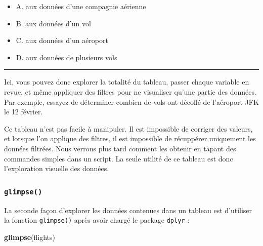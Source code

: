 \documentclass[a4paperpaper,]{article}
\newenvironment{Shaded}{\begin{snugshade}}{\end{snugshade}}
\newcommand{\KeywordTok}[1]{\textcolor[rgb]{0.12,0.11,0.11}{\textbf{#1}}}
\newcommand{\NormalTok}[1]{\textcolor[rgb]{0.12,0.11,0.11}{#1}}
\providecommand{\tightlist}{%
  \setlength{\itemsep}{0pt}\setlength{\parskip}{0pt}}
\theoremstyle{definition}
\theoremstyle{definition}
\theoremstyle{definition}
\theoremstyle{remark}
\begin{document}
\begin{itemize}
\tightlist
\item
  A. aux données d'une compagnie aérienne
\item
  B. aux données d'un vol
\item
  C. aux données d'un aéroport
\item
  D. aux données de plusieurs vols
\end{itemize}

\begin{center}\rule{0.5\linewidth}{\linethickness}\end{center}

Ici, vous pouvez donc explorer la totalité du tableau, passer chaque
variable en revue, et même appliquer des filtres pour ne visualiser
qu'une partie des données. Par exemple, essayez de déterminer combien de
vols ont décollé de l'aéroport JFK le 12 février.

Ce tableau n'est pas facile à manipuler. Il est impossible de corriger
des valeurs, et lorsque l'on applique des filtres, il est impossible de
récuppérer uniquement les données filtrées. Nous verrons plus tard
comment les obtenir en tapant des commandes simples dans un script. La
seule utilité de ce tableau est donc l'exploration visuelle des données.

\hypertarget{glimpse}{%
\subsubsection{\texorpdfstring{\texttt{glimpse()}}{glimpse()}}\label{glimpse}}

La seconde façon d'explorer les données contenues dans un tableau est
d'utiliser la fonction \texttt{glimpse()} après avoir chargé le package
\texttt{dplyr} :

\begin{Shaded}
\begin{Highlighting}[]
\KeywordTok{glimpse}\NormalTok{(flights)}
\end{Highlighting}
\end{Shaded}
\end{document}

